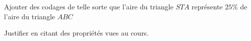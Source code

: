 
\begin{exercice}\label{exo2smath-0252}

    Ajouter des codages de telle sorte que l'aire du triangle \( STA\) représente \( 25\%\) de l'aire du triangle \( ABC\)


    Justifier en citant des propriétés vues au cours.

\end{exercice}
